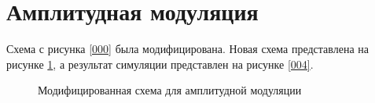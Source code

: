 \documentclass[a4paper,14pt]{extarticle}
\begin{document}
\section{Амплитудная модуляция}

Схема с рисунка \ref{000} была модифицирована. Новая схема представлена на рисунке \ref{003}, а результат симуляции представлен на рисунке \ref{004}.

\begin{figure}[H]
\begin{minipage}[h]{0.69\linewidth}
\end{minipage}
\hfill
\begin{minipage}[h]{0.29\linewidth}
\end{minipage}
\caption{Модифицированная схема для амплитудной модуляции}
\label{003}
\end{figure}
\end{document}
